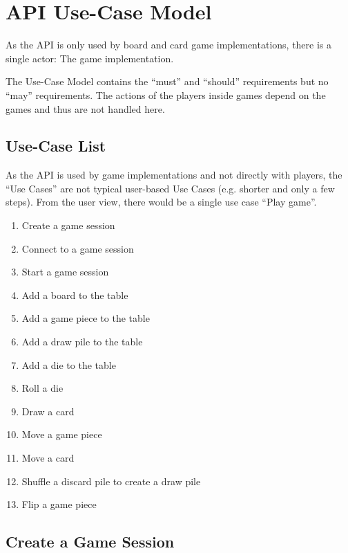 \section{API Use-Case Model}

As the API is only used by board and card game implementations, there is a
single actor: The game implementation.

The Use-Case Model contains the “must” and “should” requirements but no “may”
requirements. The actions of the players inside games depend on the games and
thus are not handled here.

\subsection{Use-Case List}

As the API is used by game implementations and not directly with players, the
``Use Cases'' are not typical user-based Use Cases (e.g. shorter and only a
few steps). From the user view, there would be a single use case ``Play game''.

\begin{enumerate}
  \item Create a game session
  \item Connect to a game session
  \item Start a game session
  \item Add a board to the table
  \item Add a game piece to the table
  \item Add a \gls{draw pile} to the table
  \item Add a \gls{die} to the table
  \item Roll a \gls{die}
  \item Draw a card
  \item Move a game piece
  \item Move a card
  \item Shuffle a \gls{discard pile} to create a \gls{draw pile}
  \item Flip a game piece
\end{enumerate}

\subsection{Create a Game Session}

